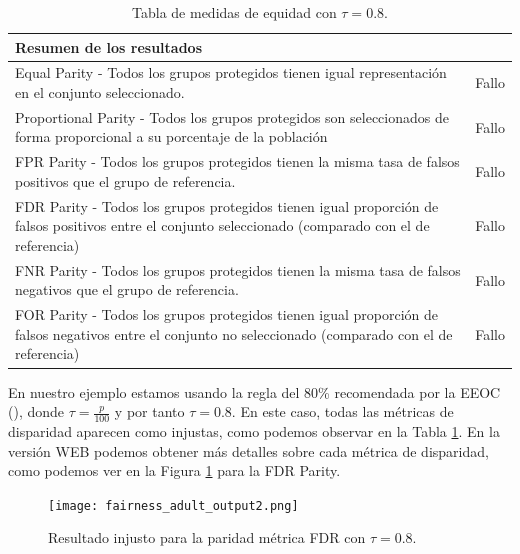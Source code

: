 \begin{table}[h]
\centering
\resizebox{17.cm}{!} {
\begin{tabular}{ll}
\textbf{Resumen de los resultados}                                                                                                                              &                              \\ \hline
Equal Parity - Todos los grupos protegidos tienen igual representación en el conjunto seleccionado.                                                     & {\color[HTML]{FE0000} Fallo} \\
Proportional Parity - Todos los grupos protegidos son seleccionados de forma proporcional a su porcentaje de la población                               & {\color[HTML]{FE0000} Fallo} \\
FPR Parity - Todos los grupos protegidos tienen la misma tasa de falsos positivos que el grupo de referencia.                                           & {\color[HTML]{FE0000} Fallo} \\
FDR Parity - Todos los grupos protegidos tienen igual proporción de falsos positivos entre el conjunto seleccionado (comparado con el de referencia)    & {\color[HTML]{FE0000} Fallo} \\
FNR Parity - Todos los grupos protegidos tienen la misma tasa de falsos negativos que el grupo de referencia.                                           & {\color[HTML]{FE0000} Fallo} \\
FOR Parity - Todos los grupos protegidos tienen igual proporción de falsos negativos entre el conjunto no seleccionado (comparado con el de referencia) & {\color[HTML]{FE0000} Fallo}
\end{tabular}
}
	\caption{Tabla de medidas de equidad con $\tau=0.8$.}
    \label{fig:medequmbral}
\end{table}

En nuestro ejemplo estamos usando la regla del 80\% recomendada por la EEOC (\cite{adverse2009}), donde $\tau=\frac{p}{100}$ y por tanto $\tau=0.8$. En este caso, todas las métricas de disparidad aparecen como injustas, como podemos observar en la Tabla \ref{fig:medequmbral}. En la versión WEB podemos obtener más detalles sobre cada métrica de disparidad, como podemos ver en la Figura \ref{fig:ejunfairaq2} para la FDR Parity.

\begin{figure}[h]
	\centering
	\texttt{[image: fairness\_adult\_output2.png]}
	\caption{Resultado injusto para la paridad métrica FDR con $\tau=0.8$.}
    \label{fig:ejunfairaq2}
\end{figure}

